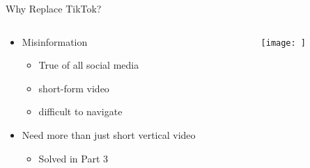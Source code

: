 \documentclass[aspectratio=169]{beamer}
\begin{document}
\begin{frame}{Why Replace TikTok?}
\begin{columns}[T]
    \begin{column}[T]{0.5\textwidth}
        \begin{itemize}
            \item Misinformation
            \begin{itemize}
                \item True of all social media
                \item short-form video
                \item difficult to navigate
            \end{itemize}
            \item Need more than just short vertical video
            \begin{itemize}
                \item Solved in Part 3
            \end{itemize}
        \end{itemize}
    \end{column}
    \begin{column}{0.5\textwidth}
        \texttt{[image: ]}
    \end{column}
\end{columns}
\end{frame}
\end{document}
